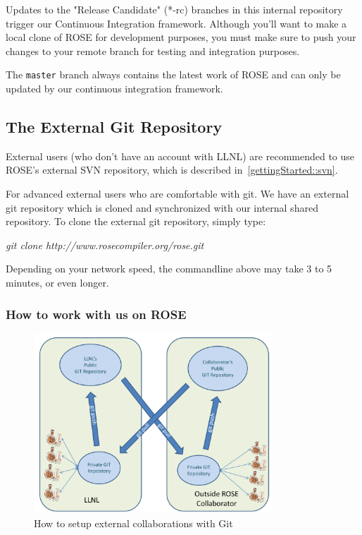 Updates to the "Release Candidate" (*-rc) branches in this internal repository
trigger our Continuous Integration framework. Although you'll want to make a
local clone of ROSE for development purposes, you must make sure to push your
changes to your remote branch for testing and integration purposes.

The \texttt{master} branch always contains the latest work of ROSE and can only
be updated by our continuous integration framework.


\subsection{The External Git Repository}

External users (who don't have an account with LLNL) are recommended to use
ROSE's external SVN repository, which is described
in~\ref{gettingStarted::svn}.

For advanced external users who are comfortable with git. 
We have an external git repository which is cloned and synchronized with our internal shared repository. 
To clone the external git repository, simply type:

\textit{git clone http://www.rosecompiler.org/rose.git}

\noindent Depending on your network speed, the commandline above may take 3 to 5
minutes, or even longer.

\subsubsection{How to work with us on ROSE}

\begin{figure}[htbp]  
  \centering
    \includegraphics[width=0.8\textwidth]{git_collaboration_diagram.pdf}
  \caption{How to setup external collaborations with Git}
  \label{fig:rose-git-collaborations}
\end{figure}

